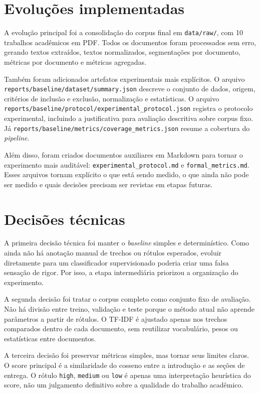 \documentclass[12pt]{article}
\begin{document}
\section{Evoluções implementadas}

A evolução principal foi a consolidação do corpus final em \texttt{data/raw/}, com 10 trabalhos acadêmicos em PDF. Todos os documentos foram processados sem erro, gerando textos extraídos, textos normalizados, segmentações por documento, métricas por documento e métricas agregadas.

Também foram adicionados artefatos experimentais mais explícitos. O arquivo \texttt{reports/baseline/dataset/summary.json} descreve o conjunto de dados, origem, critérios de inclusão e exclusão, normalização e estatísticas. O arquivo \texttt{reports/baseline/protocol/experimental\_protocol.json} registra o protocolo experimental, incluindo a justificativa para avaliação descritiva sobre corpus fixo. Já \texttt{reports/baseline/metrics/coverage\_metrics.json} resume a cobertura do \textit{pipeline}.

Além disso, foram criados documentos auxiliares em Markdown para tornar o experimento mais auditável: \texttt{experimental\_protocol.md} e \texttt{formal\_metrics.md}. Esses arquivos tornam explícito o que está sendo medido, o que ainda não pode ser medido e quais decisões precisam ser revistas em etapas futuras.

\section{Decisões técnicas}

A primeira decisão técnica foi manter o \textit{baseline} simples e determinístico. Como ainda não há anotação manual de trechos ou rótulos esperados, evoluir diretamente para um classificador supervisionado poderia criar uma falsa sensação de rigor. Por isso, a etapa intermediária priorizou a organização do experimento.

A segunda decisão foi tratar o corpus completo como conjunto fixo de avaliação. Não há divisão entre treino, validação e teste porque o método atual não aprende parâmetros a partir de rótulos. O TF-IDF é ajustado apenas nos trechos comparados dentro de cada documento, sem reutilizar vocabulário, pesos ou estatísticas entre documentos.

A terceira decisão foi preservar métricas simples, mas tornar seus limites claros. O score principal é a similaridade do cosseno entre a introdução e as seções de entrega. O rótulo \texttt{high}, \texttt{medium} ou \texttt{low} é apenas uma interpretação heurística do score, não um julgamento definitivo sobre a qualidade do trabalho acadêmico.
\end{document}
